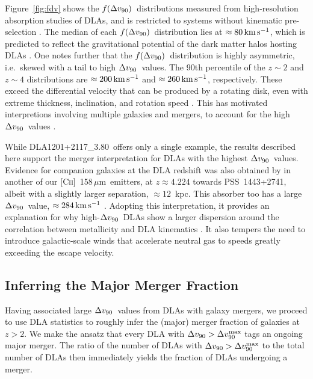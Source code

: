 \documentclass[twocolumn]{aastex62}
\newcommand{\dlaname}{DLA1201+2117\_3.80}
\newcommand{\cplus}{[\ctwo]~158\,$\mu$m}
\newcommand{\mdvninety}{\Delta v_{\rm 90}}
\newcommand{\dvninety}{$\mdvninety$}
\newcommand{\mdvmax}{\mdvninety^{\rm max}}
\newcommand{\mfdv}{f(\mdvninety)}
\newcommand{\fdv}{$\mfdv$}
\newcommand{\dvntwo}{200}    %
\newcommand{\dvnfour}{260}    %
\newcommand{\mkms}{\rm km \, s^{-1}}
\newcommand{\ctwo}{C\textsc{ii}}
\begin{document}
Figure~\ref{fig:fdv} shows the \fdv\ distributions measured from high-resolution absorption
studies of DLAs, and is restricted to systems without kinematic pre-selection 
\citep{marcel13,rafelski+12}. The median of each \fdv\ distribution lies at 
$\approx 80 \, \mkms$, which is predicted to reflect the gravitational potential of 
the dark matter halos hosting DLAs \citep{bird+15,pma+18}. One notes further that the 
\fdv\ distribution is highly asymmetric, i.e.\ skewed with a tail to high \dvninety\ values.
The 90th percentile of the $z \sim 2$ and $z \sim 4$ distributions are 
$\approx \dvntwo \, \mkms$ and $\approx \dvnfour \, \mkms$, respectively. These exceed 
the differential velocity that can be produced by a rotating disk, even with extreme 
thickness, inclination, and rotation speed \citep{pw97}. This has motivated interpretions 
involving multiple galaxies and mergers, to account for the high \dvninety\ values 
\citep[and the occasional call for non-gravitational motions, e.g.\ winds;][]{nbf98}. 

While \dlaname\ offers only a single example, the results described here support 
the merger interpretation for DLAs with the highest \dvninety\ values. Evidence for 
companion galaxies at the DLA redshift was also obtained by \citet{neeleman+19} in 
another of our \cplus\ emitters, at $z \approx 4.224$ towards PSS~1443+2741, albeit 
with a slightly larger separation, $\approx 12$~kpc. This absorber too has a large 
\dvninety\ value, $\approx 284 \, \mkms$ \citep{neeleman+19}.  Adopting this 
interpretation, it provides an explanation for why high-\dvninety\ DLAs show a 
larger dispersion around the correlation between metallicity and DLA kinematics 
\citep{pcw+08}. It also tempers the need to introduce galactic-scale winds that 
accelerate neutral gas to speeds greatly exceeding the escape velocity.

\subsection{Inferring the Major Merger Fraction}
\label{sec:mrate}

Having associated large \dvninety\ values from DLAs with galaxy mergers, we proceed 
to use DLA statistics to roughly infer the (major) merger fraction of galaxies at $z>2$. 
We make the ansatz that every DLA with $\mdvninety > \mdvmax$ tags an ongoing major 
merger. The ratio of the number of DLAs with $\mdvninety > \mdvmax$ to the total 
number of DLAs then immediately yields the fraction of DLAs undergoing a merger.
\end{document}

